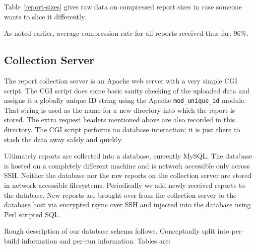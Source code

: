 \documentclass[10pt,twocolumn]{article}
\begin{document}
Table \ref{report-sizes} gives raw data on compressed report sizes in
case someone wants to slice it differently.

As noted earlier, average compression rate for all reports received
thus far: 96\%.
  
\subsection{Collection Server}

The report collection server is an Apache web server with a very
simple CGI script.  The CGI script does some basic sanity checking of
the uploaded data and assigns it a globally unique ID string using the
Apache \texttt{mod\_unique\_id} module.  That string is used as the
name for a new directory into which the report is stored.  The extra
request headers mentioned above are also recorded in this directory.
The CGI script performs no database interaction; it is just there to
stash the data away safely and quickly.

Ultimately reports are collected into a database, currently MySQL.
The database is hosted on a completely different machine and is
network accessible only across SSH.  Neither the database nor the raw
reports on the collection server are stored in network accessible
filesystems.  Periodically we add newly received reports to the
database.  New reports are brought over from the collection server to
the database host via encrypted rsync over SSH and injected into the
database using Perl scripted SQL.

Rough description of our database schema follows.  Conceptually split
into per-build information and per-run information.  Tables are:
\end{document}

